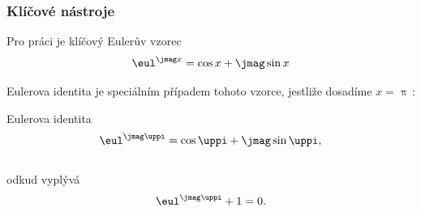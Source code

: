 \documentclass[%
  12pt,       				%
	t,                  %
	aspectratio=1610,   %
	unicode,						%
]{beamer}				    	%
\begin{document}
\begin{frame} 
	\frametitle{Klíčové nástroje}

	\begin{alertblock}{Pro práci je klíčový Eulerův vzorec}
		$$\eul^{\jmag x}=\cos x + \jmag\sin x$$
	\end{alertblock}

	\vspace{4ex}
	Eulerova identita je speciálním případem tohoto vzorce, jestliže dosadíme $x=\uppi$\,:

	\begin{block}{Eulerova identita}
		$$\eul^{\jmag \uppi}=\cos \uppi + \jmag\sin \uppi,$$\\
		odkud vyplývá
		$$\eul^{\jmag \uppi}+1=0.$$
	\end{block}
\end{frame} 
\end{document}
